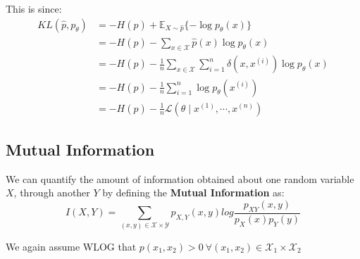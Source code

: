 \documentclass[]{article}
\begin{document}
This is since:
\begin{align*}
KL(\hat{p},p_{\theta}) &= -H(\hat{p}) + \mathbb{E}_{X\sim \hat{p}}\{-\log p_{\theta}(x)\} \\
&= -H(\hat{p}) - \sum_{x\in\mathcal{X}}\hat{p}(x)\log p_{\theta}(x)\\
&= -H(\hat{p}) - \frac{1}{n}\sum_{x\in\mathcal{X}}\sum_{i=1}^n\delta(x,x^{(i)}) \log p_{\theta}(x)\\
&= -H(\hat{p}) - \frac{1}{n}\sum_{i=1}^n\log p_{\theta}(x^{(i)})\\
&= -H(\hat{p}) - \frac{1}{n}\mathcal{L}(\theta \mid x^{(1)}, \cdots, x^{(n)})
\end{align*}

\subsection{Mutual Information}
We can quantify the amount of information obtained about one random variable $X$, through another $Y$ by defining the \textbf{Mutual Information} as:
\begin{equation}
I(X,Y)=\sum_{(x,y)\in\mathcal{X}\times\mathcal{Y}}p_{X,Y}(x,y)log\frac{p_{XY}(x,y)}{p_X(x)p_Y(y)}
\end{equation}

We again assume WLOG that \(p(x_1,x_2)>0 \ \forall (x_1,x_2)\in\mathcal{X}_1\times\mathcal{X}_2\)
\end{document}

